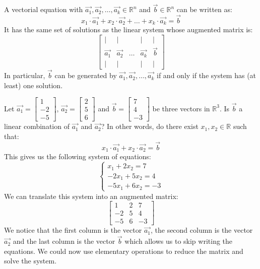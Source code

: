 A vectorial equation with $\vec{a_1}, \vec{a_2}, \ldots, \vec{a_k} \in \mathbb{R}^n$ and $\vec{b} \in \mathbb{R}^n$ can be written as:
\[
    x_1 \cdot \vec{a_1} + x_2 \cdot \vec{a_2} + \ldots + x_k \cdot \vec{a_k} = \vec{b}
\]
It has the same set of solutions as the linear system whose augmented matrix is:
\[
    \begin{bmatrix}
    | & | & & | & | \\
    \vec{a_1} & \vec{a_2} & \ldots & \vec{a_k} & \vec{b} \\
    | & | & & | & |
    \end{bmatrix}
\]
In particular, $\vec{b}$ can be generated by $\vec{a_1}, \vec{a_2}, \ldots, \vec{a_k}$ if and only if the system has (at least) one solution.

\begin{eg}
    Let $\vec{a_1} = \begin{bmatrix}1 \\ -2 \\ -5\end{bmatrix}$, $\vec{a_2} = \begin{bmatrix}2 \\ 5 \\ 6\end{bmatrix}$ and $\vec{b} = \begin{bmatrix}7 \\ 4 \\ -3\end{bmatrix}$ be three vectors in $\mathbb{R}^3$. Is $\vec{b}$ a linear combination of $\vec{a_1}$ and $\vec{a_2}$? In other words, do there exist $x_1, x_2 \in \mathbb{R}$ such that:
    \[
        x_1 \cdot \vec{a_1} + x_2 \cdot \vec{a_2} = \vec{b}
    \]
    This gives us the following system of equations:
    \[
        \begin{cases}
        x_1 + 2x_2 = 7 \\
        -2x_1 + 5x_2 = 4 \\
        -5x_1 + 6x_2 = -3
        \end{cases}
    \]
    We can translate this system into an augmented matrix:
    \[
        \begin{bmatrix}
        1 & 2 & 7 \\
        -2 & 5 & 4 \\
        -5 & 6 & -3
        \end{bmatrix}
    \]
    We notice that the first column is the vector $\vec{a_1}$, the second column is the vector $\vec{a_2}$ and the last column is the vector $\vec{b}$ which allows us to skip writing the equations. We could now use elementary operations to reduce the matrix and solve the system.
\end{eg}

